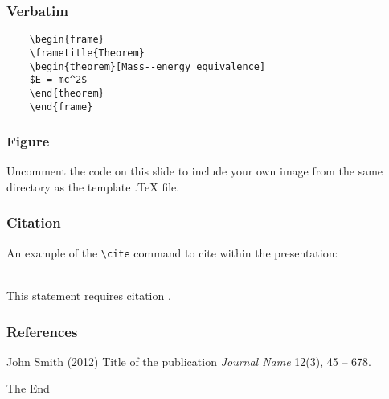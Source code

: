 \documentclass{beamer}
\begin{document}

	\begin{frame}[fragile] %
	\frametitle{Verbatim}
	\begin{example}
	\begin{verbatim}
	\begin{frame}
	\frametitle{Theorem}
	\begin{theorem}[Mass--energy equivalence]
	$E = mc^2$
	\end{theorem}
	\end{frame}\end{verbatim}
	\end{example}
	\end{frame}


	\begin{frame}
	\frametitle{Figure}
	Uncomment the code on this slide to include your own image from the same directory as the template .TeX file.
	\end{frame}


	\begin{frame}[fragile] %
	\frametitle{Citation}
	An example of the \verb|\cite| command to cite within the presentation:\\~

	This statement requires citation \cite{p1}.
	\end{frame}


	\begin{frame}
	\frametitle{References}
	\footnotesize{
	\begin{thebibliography}{99} %
	 John Smith (2012)
	\newblock Title of the publication
	\newblock \emph{Journal Name} 12(3), 45 -- 678.
	\end{thebibliography}
	}
	\end{frame}


	\begin{frame}
	\Huge{\centerline{The End}}
	\end{frame}

\end{document}
